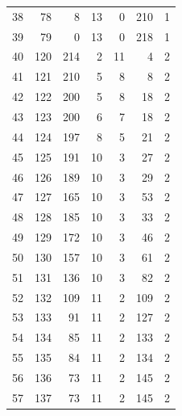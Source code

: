 \documentclass[a4paper,twoside,12pt]{book}
\begin{document}
\begin{appendices}
\begin{table}
\begin{tabular}{lrrrrrr}
		38  &     78 &         8 &        13 &               0 &             210 &         1 \\
		39  &     79 &         0 &        13 &               0 &             218 &         1 \\
		40  &    120 &       214 &         2 &              11 &               4 &         2 \\
		41  &    121 &       210 &         5 &               8 &               8 &         2 \\
		42  &    122 &       200 &         5 &               8 &              18 &         2 \\
		43  &    123 &       200 &         6 &               7 &              18 &         2 \\
		44  &    124 &       197 &         8 &               5 &              21 &         2 \\
		45  &    125 &       191 &        10 &               3 &              27 &         2 \\
		46  &    126 &       189 &        10 &               3 &              29 &         2 \\
		47  &    127 &       165 &        10 &               3 &              53 &         2 \\
		48  &    128 &       185 &        10 &               3 &              33 &         2 \\
		49  &    129 &       172 &        10 &               3 &              46 &         2 \\
		50  &    130 &       157 &        10 &               3 &              61 &         2 \\
		51  &    131 &       136 &        10 &               3 &              82 &         2 \\
		52  &    132 &       109 &        11 &               2 &             109 &         2 \\
		53  &    133 &        91 &        11 &               2 &             127 &         2 \\
		54  &    134 &        85 &        11 &               2 &             133 &         2 \\
		55  &    135 &        84 &        11 &               2 &             134 &         2 \\
		56  &    136 &        73 &        11 &               2 &             145 &         2 \\
		57  &    137 &        73 &        11 &               2 &             145 &         2 \\

\end{tabular}
\end{table}
\end{appendices}
\end{document}
